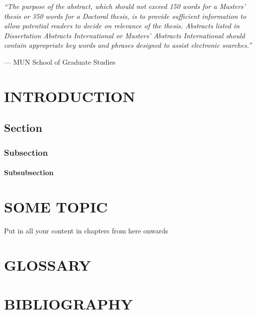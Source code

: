 \documentclass[english,a4paper,11pt]{report}
\begin{document}
	\vspace{1cm}
	
	\emph{``The purpose of the abstract, which should not exceed 150 words for
		a Masters' thesis or 350 words for a Doctoral thesis, is to provide
		sufficient information to allow potential readers to decide on relevance
		of the thesis. Abstracts listed in Dissertation Abstracts International
		or Masters' Abstracts International should contain appropriate key
		words and phrases designed to assist electronic searches.''}
	
	\hfill --- MUN School of Graduate Studies
	
	\newpage
        \doublespacing
        \pagestyle{plain}
	
	\chapter{\MakeUppercase{Introduction}}
	\section{Section}
	\subsection{Subsection}
	\subsubsection{Subsubsection}

	
	\chapter{\MakeUppercase{Some Topic}}

	Put in all your content in chapters from here onwards

	\chapter*{\MakeUppercase{Glossary}}

	\chapter*{\MakeUppercase{Bibliography}}
	
\end{document}
